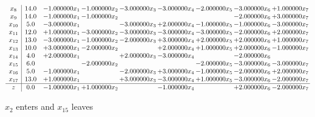 \documentclass[10pt]{article}
\begin{document}
\[\begin{array}{c| c c@{\hskip 2pt} c@{\hskip 2pt} c@{\hskip 2pt} c@{\hskip 2pt} c@{\hskip 2pt} c@{\hskip 2pt} c@{\hskip 2pt} }
 x_{8}   &  14.0 & -1.000000 x_{1} & -1.000000 x_{2} & -3.000000 x_{3} & -3.000000 x_{4} & -2.000000 x_{5} & -3.000000 x_{6} & + 1.000000 x_{7}\\
 x_{9}   &  14.0 & -1.000000 x_{1} & -1.000000 x_{2} &    &    &   & -2.000000 x_{6} & + 3.000000 x_{7}\\
 x_{10}   &  5.0 & -3.000000 x_{1} &   & -3.000000 x_{3} & + 2.000000 x_{4} & -1.000000 x_{5} & -1.000000 x_{6} & -3.000000 x_{7}\\
 x_{11}   &  12.0 & + 1.000000 x_{1} & -3.000000 x_{2} & -3.000000 x_{3} & -3.000000 x_{4} & -3.000000 x_{5} & -2.000000 x_{6} & + 2.000000 x_{7}\\
 x_{12}   &  13.0 & -3.000000 x_{1} & -1.000000 x_{2} & -2.000000 x_{3} & + 3.000000 x_{4} & + 2.000000 x_{5} & + 2.000000 x_{6} & + 1.000000 x_{7}\\
 x_{13}   &  10.0 & + 3.000000 x_{1} & -2.000000 x_{2} &   & + 2.000000 x_{4} & + 1.000000 x_{5} & + 2.000000 x_{6} & -1.000000 x_{7}\\
 x_{14}   &  4.0 & + 2.000000 x_{1} &   & + 2.000000 x_{3} & -3.000000 x_{4} &   & -2.000000 x_{6} &   \\
 x_{15}   &  6.0  &   & -2.000000 x_{2} &    &   & -2.000000 x_{5} & -3.000000 x_{6} & -3.000000 x_{7}\\
 x_{16}   &  5.0 & -1.000000 x_{1} &   & -2.000000 x_{3} & + 3.000000 x_{4} & -1.000000 x_{5} & -2.000000 x_{6} & + 2.000000 x_{7}\\
 x_{17}   &  13.0 & + 1.000000 x_{1} &   & + 3.000000 x_{3} & -3.000000 x_{4} & + 1.000000 x_{5} & -3.000000 x_{6} & -2.000000 x_{7}\\
\hline
z    &  0.0 & -1.000000 x_{1} & + 1.000000 x_{2} &   & -1.000000 x_{4} &   & + 2.000000 x_{6} & -2.000000 x_{7}\\
\end{array}\]


 $ x_{2} $ enters and $ x_{15} $ leaves 
\end{document}
